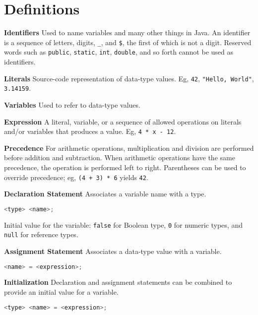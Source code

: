 \documentclass[8pt,a4paper,compress]{beamer}
\begin{document}
\section{Definitions}
\begin{frame}[fragile]
\pause
\textbf{Identifiers} Used to name variables and many other things in Java. An identifier is a sequence of letters, digits, \lstinline$_$, and \texttt{\small \$}, the first of which is not a digit. Reserved words such as \lstinline$public$, \lstinline$static$, \lstinline$int$, \lstinline$double$, and so forth cannot be used as identifiers.

\pause
\smallskip

\textbf{Literals} Source-code representation of data-type values. Eg, \lstinline$42$, \lstinline$"Hello, World"$, \lstinline$3.14159$.  

\pause
\smallskip

\textbf{Variables} Used to refer to data-type values.

\pause
\smallskip

\textbf{Expression} A literal, variable, or a sequence of allowed operations on literals and/or variables that produces a value. Eg, \lstinline$4 * x - 12$.

\pause
\smallskip

\textbf{Precedence} For arithmetic operations, multiplication and division are performed before addition and subtraction. When arithmetic operations have the same precedence, the operation is performed left to right. Parentheses can be used to override precedence; eg, \lstinline$(4 + 3) * 6$ yields \lstinline$42$. 

\pause
\smallskip

\textbf{Declaration Statement} Associates a variable name with a type.
\begin{lstlisting}[language=Java]
<type> <name>;
\end{lstlisting}
Initial value for the variable: \lstinline$false$ for Boolean type, \lstinline$0$ for numeric types, and \lstinline$null$ for reference types.

\pause
\smallskip

\textbf{Assignment Statement} Associates a data-type value with a variable.
\begin{lstlisting}[language=Java]
<name> = <expression>;
\end{lstlisting}

\pause
\smallskip

\textbf{Initialization} Declaration and assignment statements can be combined to provide an initial value for a variable.
\begin{lstlisting}[language=Java]
<type> <name> = <expression>;
\end{lstlisting}
\end{frame}
\end{document}
